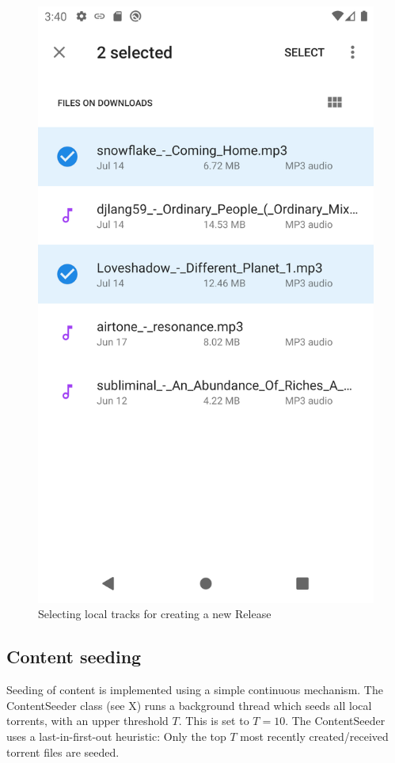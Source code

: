 \begin{figure}
        \includegraphics[width=\linewidth]{implementation/screenshot-submit-release.png}
        \caption{Selecting local tracks for creating a new Release}
        \label{fig:select-tracks}
    \endminipage\hfill
    \endminipage
\end{figure}
\subsection{Content seeding}
\label{sec:content-seeding}
Seeding of content is implemented using a simple continuous mechanism. The ContentSeeder class (see X) runs a background thread which seeds all local torrents, with an upper threshold \(T\). This is set to \(T=10\). The ContentSeeder uses a last-in-first-out heuristic: Only the top \(T\) most recently created/received torrent files are seeded.
